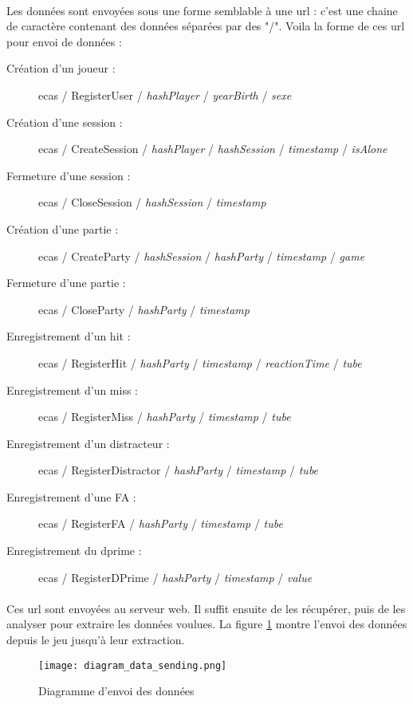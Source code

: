 \paragraph{}Les données sont envoyées sous une forme semblable à une url : c'est une chaine de caractère contenant des données séparées par des "/". Voila la forme de ces url pour
envoi de données :
\begin{description}
    \item[Création d'un joueur :] ecas / RegisterUser / \textit{hashPlayer} / \textit{yearBirth} / \textit{sexe}
    \item[Création d'une session :] ecas / CreateSession / \textit{hashPlayer} / \textit{hashSession} / \textit{timestamp} / \textit{isAlone}
    \item[Fermeture d'une session :] ecas / CloseSession / \textit{hashSession} / \textit{timestamp}
    \item[Création d'une partie :] ecas / CreateParty / \textit{hashSession} / \textit{hashParty} / \textit{timestamp} / \textit{game}
    \item[Fermeture d'une partie :] ecas / CloseParty / \textit{hashParty} / \textit{timestamp}
    \item[Enregistrement d'un hit :] ecas / RegisterHit / \textit{hashParty} / \textit{timestamp} / \textit{reactionTime} / \textit{tube}
    \item[Enregistrement d'un miss :] ecas / RegisterMiss / \textit{hashParty} / \textit{timestamp} / \textit{tube}
    \item[Enregistrement d'un distracteur :] ecas / RegisterDistractor / \textit{hashParty} / \textit{timestamp} / \textit{tube}
    \item[Enregistrement d'une FA :] ecas / RegisterFA / \textit{hashParty} / \textit{timestamp} / \textit{tube}
    \item[Enregistrement du dprime :] ecas / RegisterDPrime / \textit{hashParty} / \textit{timestamp} / \textit{value}
\end{description}

\paragraph{}Ces url sont envoyées au serveur web. Il suffit ensuite de les récupérer, puis de les analyser pour extraire les données voulues. La figure \ref{DataSending} montre l'envoi
des données depuis le jeu jusqu'à leur extraction.

\begin{figure}[H]
    \begin{center}
    \texttt{[image: diagram\_data\_sending.png]}
    \end{center}
    \caption{Diagramme d'envoi des données}
\label{DataSending}
\end{figure}


